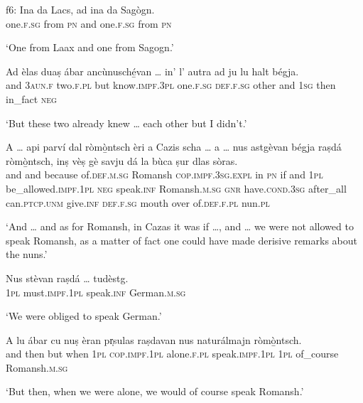 \begin{linenumbers}
\gll   f6: Ina da Lacs, ad ina da Sagògn.\\
{}  one.\textsc{f.sg} from \textsc{pn} and one.\textsc{f.sg} from \textsc{pn}\\
\end{linenumbers}
\medskip
\glt `One from Laax and one from Sagogn.'
\medskip

\begin{linenumbers}
\gll    Ad èlas duaṣ ábar ancùnusché̱van … in’ l’ autra ad ju lu halt bégja.\\
and \textsc{3aun.f} two.\textsc{f.pl} but know.\textsc{impf.3pl} {} one.\textsc{f.sg}  \textsc{def.f.sg} other and \textsc{1sg} then in\_fact \textsc{neg}\\
\end{linenumbers}
\medskip
\glt `But these two already knew … each other but I didn’t.'
\medskip

\begin{linenumbers}
\gll    A … api parví dal ròmò̱ntsch èri a Cazis scha … a … nus astgèvan bégja raṣdá ròmò̱ntsch, inṣ vèṣ gè savju dá la bùca ṣur dlas sòras.\\
and {} and because of.\textsc{def.m.sg} Romansh \textsc{cop.impf.3sg.expl} in \textsc{pn} if {} and {} \textsc{1pl} be\_allowed.\textsc{impf.1pl} \textsc{neg} speak.\textsc{inf} Romansh.\textsc{m.sg} \textsc{gnr}  have.\textsc{cond.3sg} after\_all can.\textsc{ptcp.unm} give.\textsc{inf} \textsc{def.f.sg} mouth over of.\textsc{def.f.pl} nun.\textsc{pl}\\
\end{linenumbers}
\medskip
\glt `And … and as for Romansh, in Cazas it was if …, and … we were not allowed to speak Romansh, as a matter of fact one could have made derisive remarks about the nuns.'
\medskip

\begin{linenumbers}
\gll    Nus stèvan raṣdá … tudèstg.\\
 \textsc{1pl} must.\textsc{impf.1pl} speak.\textsc{inf} {} German.\textsc{m.sg}\\
\end{linenumbers}
\medskip
\glt `We were obliged to speak German.'
\medskip

\begin{linenumbers}
\gll    A lu ábar cu nuṣ èran pr̩sulas raṣdavan nus naturálmajn ròmò̱ntsch.\\
and then but when \textsc{1pl} \textsc{cop.impf.1pl} alone.\textsc{f.pl} speak.\textsc{impf.1pl}  \textsc{1pl} of\_course Romansh.\textsc{m.sg}\\
\end{linenumbers}
\medskip
\glt `But then, when we were alone, we would of course speak Romansh.'
\medskip

